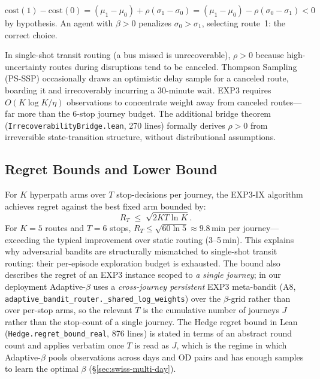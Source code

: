 \documentclass[opre,dblanonrev]{informs4}
\renewenvironment{proof}{\Trivlist\item[\hspace*{1em}\hskip\labelsep{\itshape Proof.\enskip}]\ignorespaces}{\endTrivlist\addvspace{0pt}}
\begin{document}
\begin{proof}
$\mathrm{cost}(1) - \mathrm{cost}(0)
= (\mu_1 - \mu_0) + \rho(\sigma_1 - \sigma_0)
= (\mu_1 - \mu_0) - \rho(\sigma_0 - \sigma_1) < 0$
by hypothesis.
An agent with $\beta > 0$ penalizes $\sigma_0 > \sigma_1$,
selecting route~1: the correct choice.
\end{proof}

\begin{remark}
In single-shot transit routing (a bus missed is unrecoverable),
$\rho > 0$ because high-uncertainty routes during disruptions
tend to be canceled.
Thompson Sampling (PS-SSP) occasionally draws an optimistic
delay sample for a canceled route, boarding it and irrecoverably
incurring a 30-minute wait.
EXP3 requires $O(K\log K/\eta)$ observations to concentrate
weight away from canceled routes---far more than the 6-stop
journey budget.
The additional bridge theorem (\texttt{IrrecoverabilityBridge.lean},
270 lines) formally derives $\rho > 0$ from irreversible
state-transition structure, without distributional assumptions.
\end{remark}

\subsection{Regret Bounds and Lower Bound}

\begin{theorem}\label{thm:exp3}
For $K$ hyperpath arms over $T$ stop-decisions per journey,
the EXP3-IX algorithm achieves regret against the best fixed arm bounded by:
\[
R_T \;\leq\; \sqrt{2KT\ln K}.
\]
For $K = 5$ routes and $T = 6$ stops, $R_T \leq \sqrt{60\ln 5} \approx 9.8$\,min
per journey---exceeding the typical improvement over static routing (3--5\,min).
This explains why adversarial bandits are structurally mismatched to
single-shot transit routing: their per-episode exploration budget is exhausted.
The bound also describes the regret of an EXP3 instance scoped to
\emph{a single journey}; in our deployment Adaptive-$\beta$ uses a
\emph{cross-journey persistent} EXP3 meta-bandit (A8,
\texttt{adaptive\_bandit\_router.\_shared\_log\_weights}) over the
$\beta$-grid rather than over per-stop arms, so the relevant $T$ is
the cumulative number of journeys $J$ rather than the stop-count of
a single journey. The Hedge regret bound in Lean
(\texttt{Hedge.regret\_bound\_real}, 876 lines) is stated in terms
of an abstract round count and applies verbatim once $T$ is read as
$J$, which is the regime in which Adaptive-$\beta$ pools observations
across days and OD pairs and has enough samples to learn the optimal
$\beta$ (\S\ref{sec:swiss-multi-day}).
\end{theorem}
\end{document}
